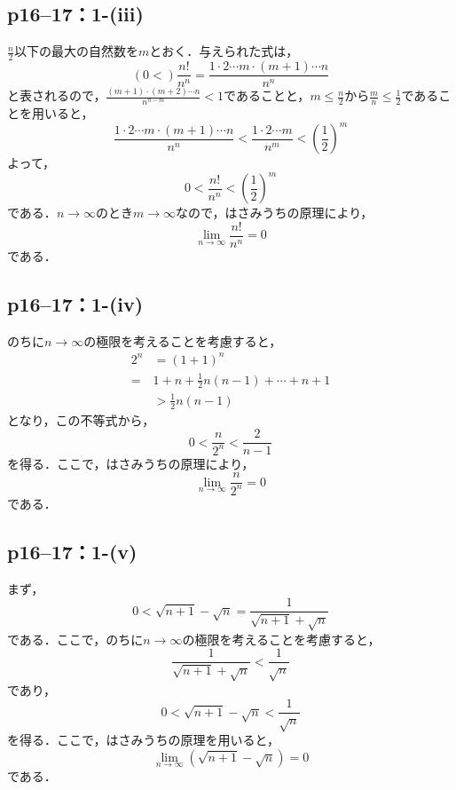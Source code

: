 \documentclass[a4paper,10pt,fleqn]{ltjsarticle}
\begin{document}
\subsection*{p16--17：1-(iii)}

\begin{tleftbar}
    $\frac{n}{2}$以下の最大の自然数を$m$とおく．与えられた式は，
    \[
        \left( 0  < \right) \frac{n!}{n^n}  = \frac{1 \cdot 2 \dotsm m \cdot (m+1) \dotsm n}{n^n}
    \]
    と表されるので，$\frac{(m+1) \cdot (m+2) \dotsm n}{n^{n-m}} <1$であることと，$m \le \frac{n}{2}$から$\frac{m}{n} \le \frac{1}{2}$であることを用いると，
    \[
        \frac{1 \cdot 2 \dotsm m \cdot (m+1) \dotsm n}{n^n} < \frac{1 \cdot 2 \dotsm m}{n^m} <\left(\frac{1}{2}\right)^m
    \]
    よって，
    \[
        0 < \frac{n!}{n^n} <\left(\frac{1}{2}\right)^m
    \]
    である．$n \to \infty$のとき$m \to \infty$なので，はさみうちの原理により，
    \[
        \lim_{n \to \infty}\frac{n!}{n^n} =0
    \]
    である．
\end{tleftbar}
\subsection*{p16--17：1-(iv)}
\begin{tleftbar}
    のちに$n \to \infty$の極限を考えることを考慮すると，
    \begin{align*}
        2^n & = (1+1)^n                            \\
        =   & 1+n +\frac{1}{2} n(n-1)+ \cdots +n+1 \\
            & > \frac{1}{2} n(n-1)
    \end{align*}
    となり，この不等式から，
    \[
        0< \frac{n}{2^n} < \frac{2}{n-1}
    \]
    を得る．ここで，はさみうちの原理により，
    \[
        \lim_{n \to \infty} \frac{n}{2^n}=0
    \]
    である．
\end{tleftbar}

\subsection*{p16--17：1-(v)}
\begin{tleftbar}
    まず，
    \[
        0<\sqrt{n+1} - \sqrt{n} = \frac{1}{\sqrt{n+1} + \sqrt{n}}
    \]
    である．ここで，のちに$n \to \infty$の極限を考えることを考慮すると，
    \[
        \frac{1}{\sqrt{n+1} + \sqrt{n}} < \frac{1}{\sqrt{n}}
    \]
    であり，
    \[
        0< \sqrt{n+1} - \sqrt{n} <\frac{1}{\sqrt{n}}
    \]
    を得る．ここで，はさみうちの原理を用いると，
    \[
        \lim_{n \to \infty} (\sqrt{n+1} - \sqrt{n} )=0
    \]
    である．
\end{tleftbar}
\end{document}
